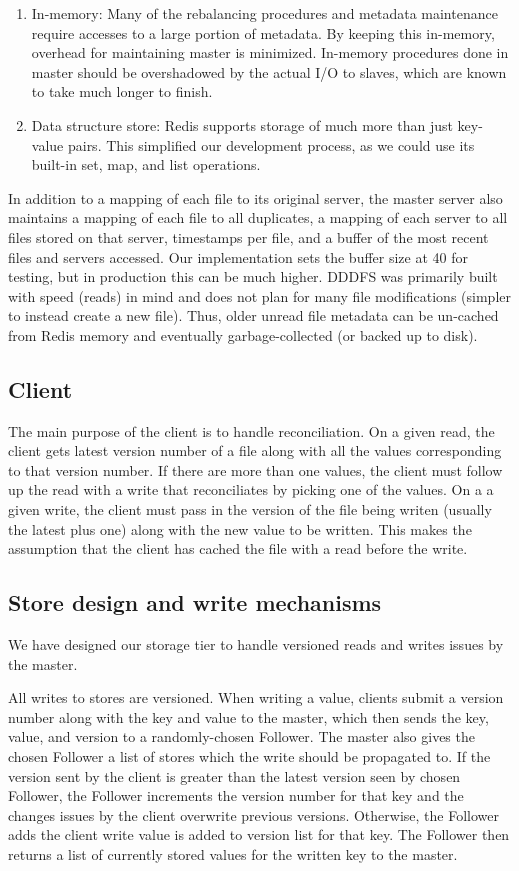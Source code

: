 \documentclass[twoside]{article}
\begin{document}
\begin{multicols}{2}
\begin{enumerate}
	\item In-memory: Many of the rebalancing procedures and metadata maintenance require accesses to a large portion of metadata. By keeping this in-memory, overhead for maintaining master is minimized. In-memory procedures done in master should be overshadowed by the actual I/O to slaves, which are known to take much longer to finish.
	\item Data structure store: Redis supports storage of much more than just key-value pairs. This simplified our development process, as we could use its built-in set, map, and list operations.
\end{enumerate}
In addition to a mapping of each file to its original server, the master server also maintains a mapping of each file to all duplicates, a mapping of each server to all files stored on that server, timestamps per file, and a buffer of the most recent files and servers accessed. Our implementation sets the buffer size at 40 for testing, but in production this can be much higher. DDDFS was primarily built with speed (reads) in mind and does not plan for many file modifications (simpler to instead create a new file). Thus, older unread file metadata can be un-cached from Redis memory and eventually garbage-collected (or backed up to disk).

\subsection*{Client}
The main purpose of the client is to handle reconciliation. On a given read, the client gets latest version number of a file along with all the values corresponding to that version number. If there are more than one values, the client must follow up the read with a write that reconciliates by picking one of the values. On a a given write, the client must pass in the version of the file being writen (usually the latest plus one) along with the new value to be written. This makes the assumption that the client has cached the file with a read before the write. 

\subsection*{Store design and write mechanisms}
We have designed our storage tier to handle versioned reads and writes issues by the master. 

All writes to stores are versioned. When writing a value, clients submit a version number along with the key and value to the master, which then sends the key, value, and version to a randomly-chosen Follower. The master also gives the chosen Follower a list of stores which the write should be propagated to. If the version sent by the client is greater than the latest version seen by chosen Follower, the Follower increments the version number for that key and the changes issues by the client overwrite previous versions. Otherwise, the Follower adds the client write value is added to version list for that key. The Follower then returns a list of currently stored values for the written key to the master.


\end{multicols}
\end{document}
